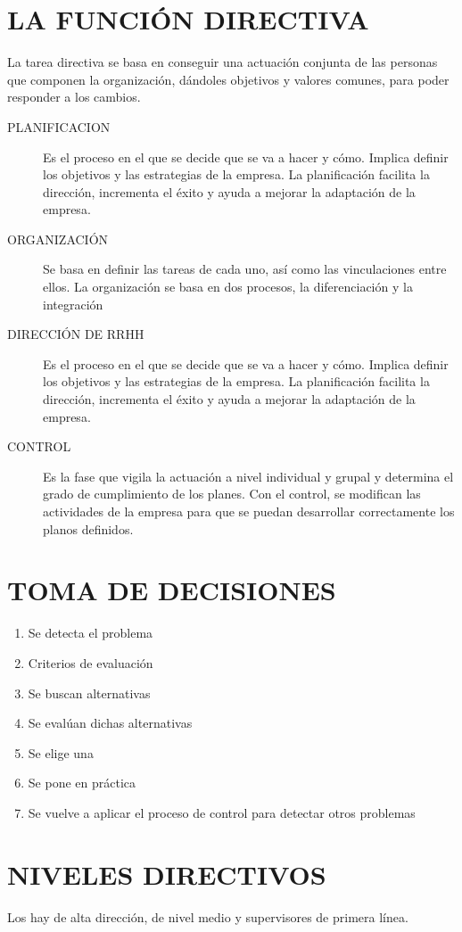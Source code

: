 \documentclass[12pt, twoside, openright]{report} %
\begin{document}
\section{LA FUNCIÓN DIRECTIVA}
La tarea directiva se basa en conseguir una actuación conjunta de las personas que componen la organización, dándoles objetivos y valores comunes, para poder responder a los cambios.
\begin{description}
	\item[PLANIFICACION] Es el proceso en el que se decide que se va a hacer y cómo. Implica definir los objetivos y las estrategias de la empresa. La planificación facilita la dirección, incrementa el éxito y ayuda a mejorar la adaptación de la empresa.
	\item[ORGANIZACIÓN] Se basa en definir las tareas de cada uno, así como las vinculaciones entre ellos. La organización se basa en dos procesos, la diferenciación y la integración
	\item[DIRECCIÓN DE RRHH] Es el proceso en el que se decide que se va a hacer y cómo. Implica definir los objetivos y las estrategias de la empresa. La planificación facilita la dirección, incrementa el éxito y ayuda a mejorar la adaptación de la empresa.
	\item[CONTROL] Es la fase que vigila la actuación a nivel individual y grupal y determina el grado de cumplimiento de los planes. Con el control, se modifican las actividades de la empresa para que se puedan desarrollar correctamente los planos definidos.
\end{description}

\section{TOMA DE DECISIONES}
\begin{enumerate}
	\item Se detecta el problema
	\item Criterios de evaluación
	\item Se buscan alternativas
	\item Se evalúan dichas alternativas
	\item Se elige una
	\item Se pone en práctica
	\item Se vuelve a aplicar el proceso de control para detectar otros problemas
\end{enumerate}

\section{NIVELES DIRECTIVOS}
Los hay de alta dirección, de nivel medio y supervisores de primera línea.
\end{document}
